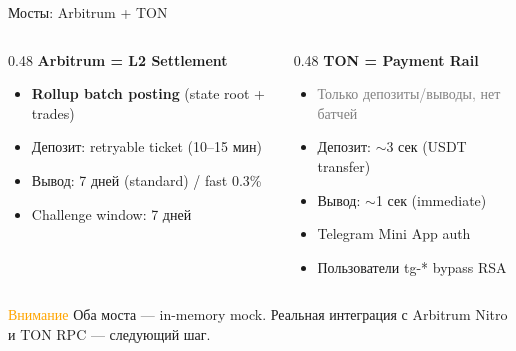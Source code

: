 \documentclass[aspectratio=169]{beamer}
\begin{document}
\begin{frame}{Мосты: Arbitrum + TON}

\begin{columns}[t]
\begin{column}{0.48\textwidth}
\textbf{Arbitrum = L2 Settlement}
\begin{itemize}
    \item \textbf{Rollup batch posting} (state root + trades)
    \item Депозит: retryable ticket (10--15 мин)
    \item Вывод: 7 дней (standard) / fast 0.3\%
    \item Challenge window: 7 дней
\end{itemize}
\end{column}
\begin{column}{0.48\textwidth}
\textbf{TON = Payment Rail}
\begin{itemize}
    \item \textcolor{gray}{Только депозиты/выводы, нет батчей}
    \item Депозит: $\sim$3 сек (USDT transfer)
    \item Вывод: $\sim$1 сек (immediate)
    \item Telegram Mini App auth
    \item Пользователи tg-* bypass RSA
\end{itemize}
\end{column}
\end{columns}
\vspace{0.5em}
\begin{block}{\textcolor{orange}{Внимание}}
Оба моста --- in-memory mock. Реальная интеграция с Arbitrum Nitro и TON RPC --- следующий шаг.
\end{block}
\end{frame}
\end{document}

